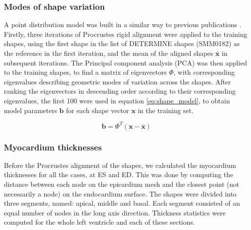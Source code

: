 \documentclass{llncs}
\begin{document}
\subsubsection{Modes of shape variation}
A point distribution model was built in a similar way to previous publications \cite{VanAssen2006,Lotjonen2004}. Firstly, three iterations of Procrustes rigid alignment were applied to the training shapes, using the first shape in the list of DETERMINE shapes (SMM0182) as the reference in the first iteration, and the mean of the aligned shapes $\bar{\textbf{x}} $ in subsequent iterations. The Principal component analysis (PCA) was then applied to the training shapes, to find a matrix of eigenvectors $\Phi$, with corresponding eigenvalues describing geometric modes of variation across the shapes. After ranking the eigenvectors in descending order according to their corresponding eigenvalues, the first 100 were used in equation \ref{eq:shape_model}, to obtain model parameters $\textbf{b} $ for each shape vector $ \textbf{x} $ in the training set.  

\begin{equation} \label{eq:shape_model}
\textbf{b} = \Phi^T(\textbf{x} - \bar{\textbf{x}} )
\end{equation}

\subsubsection{Myocardium thicknesses}
Before the Procrustes alignment of the shapes, we calculated the myocardium thicknesses for all the cases, at ES and ED. This was done by computing the distance between each node on the epicardium mesh and the closest point (not necessarily a node) on the endocardium surface. The shapes were divided into three segments, named: apical, middle and basal. Each segment consisted of an equal number of nodes in the long axis direction. Thickness statistics were computed for the whole left ventricle and each of these sections.
\end{document}
